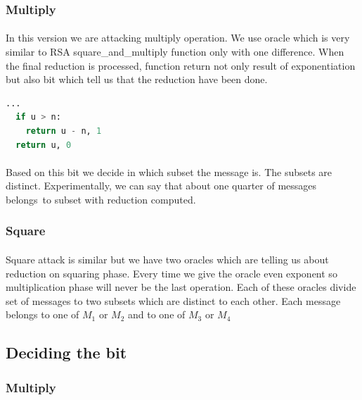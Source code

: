 \documentclass[thesis=B,english]{FITthesis}[2012/10/20]
\begin{document}

\subsubsection{Multiply}
\paragraph*{}{
In this version we are attacking multiply operation. We use oracle which is very similar to RSA square\_and\_multiply function only with one difference.
When the final reduction is processed, function return not only result of exponentiation but also bit which tell us that the reduction have been done.}

\begin{lstlisting}[language=Python]
  ...
  if u > n:
    return u - n, 1
  return u, 0
\end{lstlisting}

\paragraph*{}
{
Based on this bit we decide in which subset the message is. The subsets are distinct. Experimentally, we can say that about one quarter of messages belongs~to
subset with reduction computed.
}
\subsubsection{Square}
\paragraph*{}{
Square attack is similar but we have two oracles which are telling us about reduction on squaring phase. Every time we give the oracle even exponent so 
multiplication phase will never be the last operation. Each of these oracles divide set of messages to two subsets which are distinct to each other. Each message 
belongs to one of \(M_1\) or \(M_2\) and to one of \(M_3\) or \(M_4\)
}

\subsection{Deciding the bit}

\subsubsection{Multiply}
\end{document}
